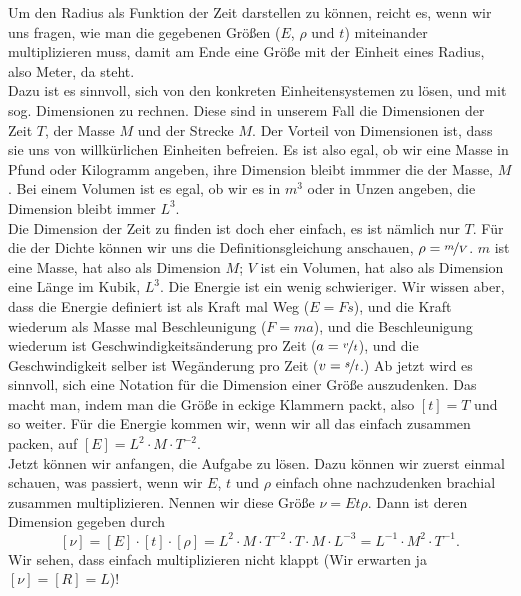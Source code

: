 \begin{Answer}[ref  = trinity]
	\Question Um den Radius als Funktion der Zeit darstellen zu können, reicht es, wenn wir uns fragen, wie man die gegebenen Größen ($E$, $\rho$  und $t$) miteinander multiplizieren muss, damit am Ende eine Größe mit der Einheit eines Radius, also Meter, da steht.\\
	Dazu ist es sinnvoll, sich von den konkreten Einheitensystemen zu lösen, und mit sog. Dimensionen zu rechnen. Diese sind in unserem Fall die Dimensionen der Zeit $T$, der Masse $M$ und der Strecke $M$. Der Vorteil von Dimensionen ist, dass sie uns von willkürlichen Einheiten befreien. Es ist also egal, ob wir eine Masse in Pfund oder Kilogramm angeben, ihre Dimension bleibt immmer die der Masse, $M$. Bei einem Volumen ist es egal, ob wir es in $m^3$ oder in Unzen angeben, die Dimension bleibt immer $L^3$.\\
	Die Dimension der Zeit zu finden ist doch eher einfach, es ist nämlich nur $T$. Für die der Dichte können wir uns die Definitionsgleichung anschauen, $\rho = \nicefrac{m}{V}$. $m$ ist eine Masse, hat also als Dimension $M$; $V$ ist ein Volumen, hat also als Dimension eine Länge im Kubik, $L^3$. Die Energie ist ein wenig schwieriger. Wir wissen aber, dass die Energie definiert ist als Kraft mal Weg ($ E = Fs$), und die Kraft wiederum als Masse mal Beschleunigung ($F = m a$), und die Beschleunigung wiederum ist Geschwindigkeitsänderung pro Zeit ($a = \nicefrac{v}{t}$), und die Geschwindigkeit selber ist Wegänderung pro Zeit ($v=\nicefrac{s}{t}$.) Ab jetzt wird es sinnvoll, sich eine Notation für die Dimension einer Größe auszudenken. Das macht man, indem man die Größe in eckige Klammern packt, also $\left[t\right] = T$ und so weiter. Für die Energie kommen wir, wenn wir all das einfach zusammen packen, auf $\left[E\right] = L^2 \cdot M\cdot T^{-2}$.\\
	Jetzt können wir anfangen, die Aufgabe zu lösen. Dazu können wir zuerst einmal schauen, was passiert, wenn wir $E$, $t$ und $\rho$ einfach ohne nachzudenken brachial zusammen multiplizieren. Nennen wir diese Größe $\nu = Et\rho$. Dann ist deren Dimension gegeben durch
	\begin{equation}\label{trinity:wrongsol}
		\left[\nu \right] = \left[E\right]\cdot \left[t\right]\cdot \left[\rho\right] = L^2\cdot M \cdot T^{-2}\cdot T \cdot M \cdot L^{-3} = L^{-1}\cdot M^2 \cdot T^{-1}.
	\end{equation}
	Wir sehen, dass einfach multiplizieren nicht klappt (Wir erwarten ja $\left[\nu\right] = \left[R\right] = L$)!\\

\end{Answer}
